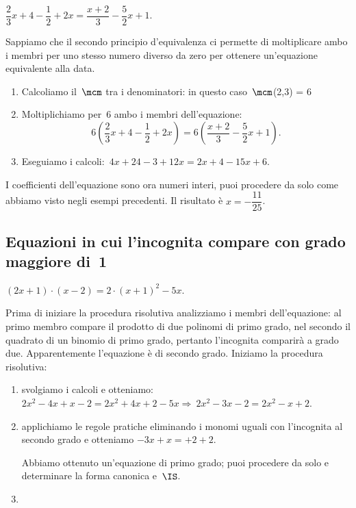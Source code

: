  \begin{esempio}{}{}
\(\dfrac{2}{3}x+4-\dfrac{1}{2}+2x=\dfrac{x+2}{3}-\dfrac{5}{2}x+1\).

Sappiamo che il secondo principio d'equivalenza ci
permette di moltiplicare ambo i membri per uno stesso numero diverso da
zero per ottenere un'equazione equivalente alla data.

\begin{enumerate}
 \item Calcoliamo il~\(\mcm\) tra i denominatori: in questo
caso~\(\mcm\)(2,3) = 6
 \item Moltiplichiamo per~6 ambo i membri
dell'equazione:
\[6\left(\dfrac{2}{3}x+4-\dfrac{1}{2}+2x\right)=6\left(\dfrac{x+2}{3}-\dfrac{5
}{
2}x+1\right).\]
 \item Eseguiamo i calcoli:~\(4x+24-3+12x=2x+4-15x+6\).
\end{enumerate}

I coefficienti dell'equazione sono ora numeri interi,
puoi procedere da solo come abbiamo visto negli esempi precedenti. Il 
risultato 
è \(x=-\dfrac{11}{25}\).
\end{esempio}


\subsection{Equazioni in cui l'incognita compare con grado maggiore di~1}

 \begin{esempio}{}{}

\((2x+1)\cdot (x-2)=2\cdot (x+1)^{2}-5x\).

Prima di iniziare la procedura risolutiva analizziamo i membri
dell'equazione: al primo membro compare il prodotto
di due polinomi di primo grado, nel secondo il quadrato di un binomio
di primo grado, pertanto l'incognita comparirà a grado due. Apparentemente
l'equazione è di secondo grado. Iniziamo la procedura
risolutiva:

\begin{enumerate}
 \item svolgiamo i calcoli e otteniamo:
\(2x^{2}-4x+x-2=2x^{2}+4x+2-5x\Rightarrow~2x^{2}-3x-2=2x^{2}-x+2.\)
 \item applichiamo le regole pratiche eliminando i monomi
uguali con l'incognita al secondo grado e otteniamo
\(-3x+x=+2+2\).

Abbiamo ottenuto un'equazione di primo grado; puoi
procedere da solo e determinare la forma canonica e~\(\IS\).
 \item \dotfill
\end{enumerate}

 \end{esempio}

